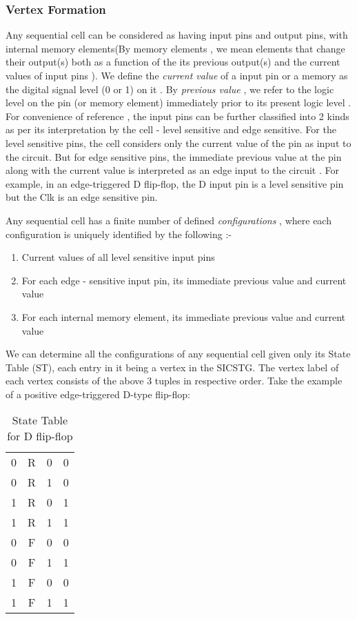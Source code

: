 \documentclass[final]{ieee}
\begin{document}
\subsubsection{Vertex Formation}
\label{vertex_defn}
Any sequential cell can be considered as having  input pins and  output pins, with  internal memory elements(By memory elements , we mean elements that change their output(s) both as a function of the its previous output(s) and the current values of input pins ). We define the \textit{current value} of a input pin or a memory as the digital signal level (0 or 1) on it . By \textit{previous value} , we refer to the logic level on the pin (or memory element) immediately prior to its present logic level . For convenience of reference , the input pins can be further classified into 2 kinds as per its interpretation by the cell - level sensitive and edge sensitive. For the level sensitive pins, the cell considers only the current value of the pin as input to the circuit. But for edge sensitive pins, the immediate previous value at the pin along with the current value is interpreted as an edge input to the circuit . For example, in an edge-triggered D flip-flop, the D input pin is a level sensitive pin but the Clk is an edge sensitive pin.

Any sequential cell has a finite number of defined {\it configurations }, where each configuration is uniquely identified by the following :-
\begin{enumerate}
\item Current values of all level sensitive input pins
\item For each edge - sensitive input pin, its immediate previous value and current value
\item For each internal memory element, its immediate previous value and current value 
\end{enumerate}

We can determine all the configurations of any sequential cell given only its State Table (ST),  each entry in it being a vertex in the SICSTG. The vertex label of each vertex consists of the above 3 tuples in respective order. Take the example of a positive edge-triggered D-type flip-flop:

\begin{table}
\begin{center}
\begin{tabular}{|c|c|c|c|} \hline
 &  &  &  \\ \hline
0   &   R   &    0    & 0 \\
0   &   R   &    1    & 0 \\
1   &   R   &    0    & 1 \\
1   &   R   &    1    & 1 \\
0   &   F   &    0    & 0 \\
0   &   F   &    1    & 1 \\
1   &   F   &    0    & 0 \\
1   &   F   &    1    & 1 \\ \hline
\end{tabular}
\caption{State Table for D flip-flop} \label{dffq}
\end{center}
\end{table}
\end{document}
